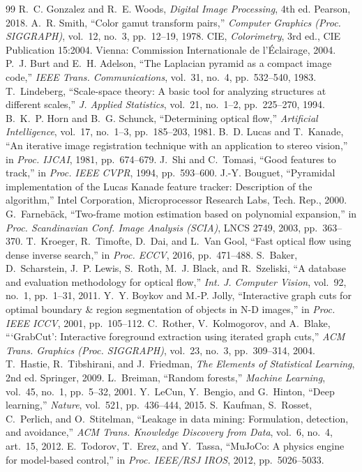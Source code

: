 \documentclass[11pt]{article}
\begin{document}
\footnotesize
\begin{thebibliography}{99}\setlength{\itemsep}{0pt}\setlength{\parskip}{0pt}
 R.~C. Gonzalez and R.~E. Woods, \emph{Digital Image Processing}, 4th ed. Pearson, 2018.
 A.~R. Smith, ``Color gamut transform pairs,'' \emph{Computer Graphics (Proc. SIGGRAPH)}, vol.~12, no.~3, pp.~12--19, 1978.
 CIE, \emph{Colorimetry}, 3rd ed., CIE Publication 15:2004. Vienna: Commission Internationale de l'\'Eclairage, 2004.
 P.~J. Burt and E.~H. Adelson, ``The Laplacian pyramid as a compact image code,'' \emph{IEEE Trans. Communications}, vol.~31, no.~4, pp.~532--540, 1983.
 T.~Lindeberg, ``Scale-space theory: A basic tool for analyzing structures at different scales,'' \emph{J. Applied Statistics}, vol.~21, no.~1--2, pp.~225--270, 1994.
 B.~K.~P. Horn and B.~G. Schunck, ``Determining optical flow,'' \emph{Artificial Intelligence}, vol.~17, no.~1--3, pp.~185--203, 1981.
 B.~D. Lucas and T.~Kanade, ``An iterative image registration technique with an application to stereo vision,'' in \emph{Proc. IJCAI}, 1981, pp.~674--679.
 J.~Shi and C.~Tomasi, ``Good features to track,'' in \emph{Proc. IEEE CVPR}, 1994, pp.~593--600.
 J.-Y. Bouguet, ``Pyramidal implementation of the Lucas Kanade feature tracker: Description of the algorithm,'' Intel Corporation, Microprocessor Research Labs, Tech. Rep., 2000.
 G.~Farneb\"ack, ``Two-frame motion estimation based on polynomial expansion,'' in \emph{Proc. Scandinavian Conf. Image Analysis (SCIA)}, LNCS 2749, 2003, pp.~363--370.
 T.~Kroeger, R.~Timofte, D.~Dai, and L.~Van Gool, ``Fast optical flow using dense inverse search,'' in \emph{Proc. ECCV}, 2016, pp.~471--488.
 S.~Baker, D.~Scharstein, J.~P. Lewis, S.~Roth, M.~J. Black, and R.~Szeliski, ``A database and evaluation methodology for optical flow,'' \emph{Int. J. Computer Vision}, vol.~92, no.~1, pp.~1--31, 2011.
 Y.~Y. Boykov and M.-P. Jolly, ``Interactive graph cuts for optimal boundary \& region segmentation of objects in N-D images,'' in \emph{Proc. IEEE ICCV}, 2001, pp.~105--112.
 C.~Rother, V.~Kolmogorov, and A.~Blake, ```GrabCut': Interactive foreground extraction using iterated graph cuts,'' \emph{ACM Trans. Graphics (Proc. SIGGRAPH)}, vol.~23, no.~3, pp.~309--314, 2004.
 T.~Hastie, R.~Tibshirani, and J.~Friedman, \emph{The Elements of Statistical Learning}, 2nd ed. Springer, 2009.
 L.~Breiman, ``Random forests,'' \emph{Machine Learning}, vol.~45, no.~1, pp.~5--32, 2001.
 Y.~LeCun, Y.~Bengio, and G.~Hinton, ``Deep learning,'' \emph{Nature}, vol.~521, pp.~436--444, 2015.
 S.~Kaufman, S.~Rosset, C.~Perlich, and O.~Stitelman, ``Leakage in data mining: Formulation, detection, and avoidance,'' \emph{ACM Trans. Knowledge Discovery from Data}, vol.~6, no.~4, art.~15, 2012.
 E.~Todorov, T.~Erez, and Y.~Tassa, ``MuJoCo: A physics engine for model-based control,'' in \emph{Proc. IEEE/RSJ IROS}, 2012, pp.~5026--5033.
\end{thebibliography}
\end{document}
